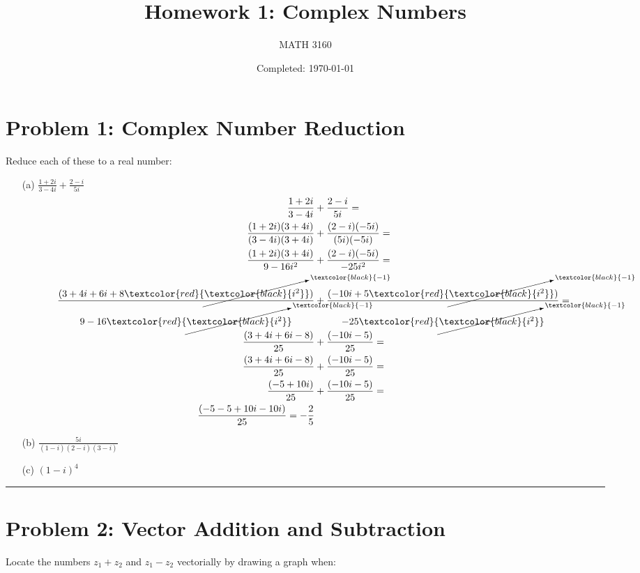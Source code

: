 \documentclass{article}
\title{Homework 1: Complex Numbers}
\author{
  MATH 3160\\
  \myauthor
}
\date{Completed: \today}
\newcommand{\canceling}[2]{\textcolor{red}{\cancelto{\textcolor{black}{#1}}{\textcolor{black}{#2}}}}
\begin{document}
\maketitle %


\section*{Problem 1: Complex Number Reduction}
Reduce each of these to a real number:
\begin{enumerate}
\item[(a)] $ \frac{1+2i}{3-4i} + \frac{2-i}{5i}$
  \begin{align*}
    \frac{1+2i}{3-4i} &+ \frac{2-i}{5i} = \\
    \frac{(1+2i)(3+4i)}{(3-4i)(3+4i)} &+ \frac{(2-i)(-5i)}{(5i)(-5i)} = \\
    \frac{(1+2i)(3+4i)}{9-16i^2} &+ \frac{(2-i)(-5i)}{-25i^2} = \\
    \frac{(3+4i+6i+8\canceling{-1}{i^2})}{9-16\canceling{-1}{i^2}} &+ \frac{(-10i+5\canceling{-1}{i^2})}{-25\canceling{-1}{i^2}} = \\
    \frac{(3+4i+6i-8)}{25} &+ \frac{(-10i-5)}{25} = \\
    \frac{(3+4i+6i-8)}{25} &+ \frac{(-10i-5)}{25} = \\
    \frac{(-5+10i)}{25} &+ \frac{(-10i-5)}{25} = \\
    \frac{(-5-5+10i -10i)}{25} = -\frac{2}{5}\\
  \end{align*}
\item[(b)] $ \frac{5i}{(1-i)(2-i)(3-i)}$
\item[(c)] $ (1-i)^4$
\end{enumerate}

\vspace{.5cm} %

\hrule %

\newpage
\section*{Problem 2: Vector Addition and Subtraction}
Locate the numbers $z_1+z_2$ and $z_1 - z_2$ vectorially by drawing a graph when:
\end{document}
